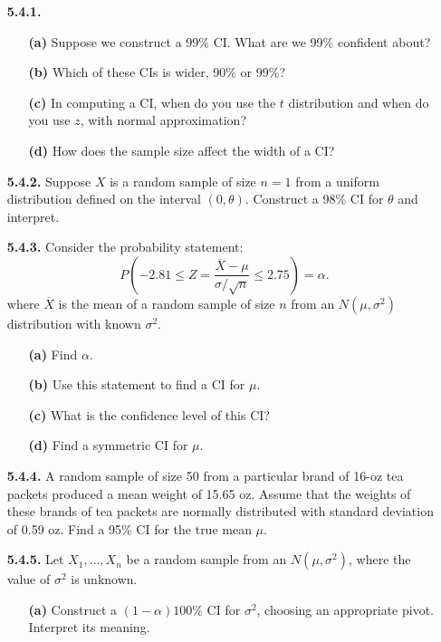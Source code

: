 \begin{enumerate}
    \item[\textbf{5.4.1.}] \begin{enumerate}
        \item[\textbf{(a)}] Suppose we construct a 99\% CI. What are we 99\% confident about?
        \item[\textbf{(b)}] Which of these CIs is wider, 90\% or 99\%?
        \item[\textbf{(c)}] In computing a CI, when do you use the $t$ distribution and when do you use $z$, with normal approximation?
        \item[\textbf{(d)}] How does the sample size affect the width of a CI?
    \end{enumerate}
    \item[\textbf{5.4.2.}] Suppose $X$ is a random sample of size $n = 1$ from a uniform distribution defined on the interval $(0, \theta)$. Construct a 98\% CI for $\theta$ and interpret.
    \item[\textbf{5.4.3.}] Consider the probability statement:
    \[
    P\left(-2.81 \leq Z = \frac{\overline{X} - \mu}{\sigma/\sqrt{n}} \leq 2.75\right) = \alpha.
    \]
    where $\overline{X}$ is the mean of a random sample of size $n$ from an $N(\mu, \sigma^2)$ distribution with known $\sigma^2$.
    \begin{enumerate}
        \item[\textbf{(a)}] Find $\alpha$.
        \item[\textbf{(b)}] Use this statement to find a CI for $\mu$.
        \item[\textbf{(c)}] What is the confidence level of this CI?
        \item[\textbf{(d)}] Find a symmetric CI for $\mu$.
    \end{enumerate}
    \item[\textbf{5.4.4.}] A random sample of size 50 from a particular brand of 16-oz tea packets produced a mean weight of 15.65 oz. Assume that the weights of these brands of tea packets are normally distributed with standard deviation of 0.59 oz. Find a 95\% CI for the true mean $\mu$.
    \item[\textbf{5.4.5.}] Let $X_1, \ldots, X_n$ be a random sample from an $N(\mu, \sigma^2)$, where the value of $\sigma^2$ is unknown.
    \begin{enumerate}
        \item[\textbf{(a)}] Construct a $(1 - \alpha)100\%$ CI for $\sigma^2$, choosing an appropriate pivot. Interpret its meaning.

\end{enumerate}
\end{enumerate}
